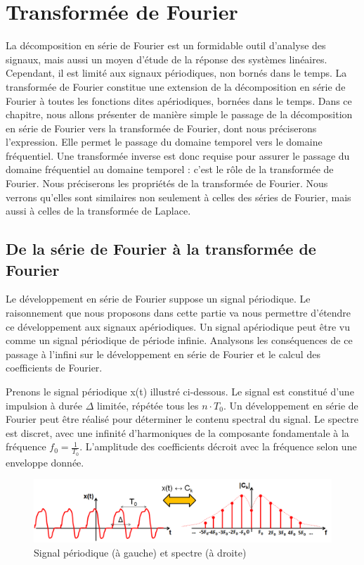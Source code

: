 \chapter{Transformée de Fourier}

	La décomposition en série de Fourier est un formidable outil d'analyse des signaux, mais aussi un moyen d'étude de la réponse des systèmes linéaires. Cependant, il est limité aux signaux périodiques, non bornés dans le temps. La transformée de Fourier constitue une extension de la décomposition en série de Fourier à toutes les fonctions dites apériodiques, bornées dans le temps. Dans ce chapitre, nous allons présenter de manière simple le passage de la décomposition en série de Fourier vers la transformée de Fourier, dont nous préciserons l'expression. Elle permet le passage du domaine temporel vers le domaine fréquentiel. Une transformée inverse est donc requise pour assurer le passage du domaine fréquentiel au domaine temporel : c'est le rôle de la transformée de Fourier.
	Nous préciserons les propriétés de la transformée de Fourier. Nous verrons qu'elles sont similaires non seulement à celles des séries de Fourier, mais aussi à celles de la transformée de Laplace. 
	
	\section{De la série de Fourier à la transformée de Fourier}
	Le développement en série de Fourier suppose un signal périodique. Le raisonnement que nous proposons dans cette partie va nous permettre d'étendre ce développement aux signaux apériodiques. Un signal apériodique peut être vu comme un signal périodique de période infinie. Analysons les conséquences de ce passage à l'infini sur le développement en série de Fourier et le calcul des coefficients de Fourier.
	
	Prenons le signal périodique x(t) illustré ci-dessous. Le signal est constitué d'une impulsion à durée $\Delta$ limitée, répétée tous les $n\cdot T_0$. Un développement en série de Fourier peut être réalisé pour déterminer le contenu spectral du signal. Le spectre est discret, avec une infinité d'harmoniques de la composante fondamentale à la fréquence $f_0=\frac{1}{T_0}$. L'amplitude des coefficients décroit avec la fréquence selon une enveloppe donnée.
	
	\begin{figure}[h!]
		\centering
		\includegraphics[scale=0.5]{images/Serie_To_Transfo_Fourier_1.png}
		\caption{Signal périodique (à gauche) et spectre (à droite)}	
		\label{Fig:Serie_To_Transfo_Fourier_1} 
	\end{figure}

